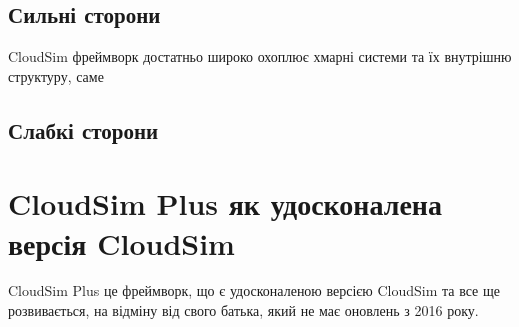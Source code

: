 \subsection{Сильні сторони}

CloudSim фреймворк \cite{CloudSim} достатньо широко охоплює хмарні системи та їх внутрішню структуру, саме 

\subsection{Слабкі сторони}


\section{CloudSim Plus як удосконалена версія CloudSim}

CloudSim Plus \cite{CloudSimPlus} це фреймворк, що є удосконаленою версією CloudSim та все ще розвивається, на відміну від свого батька, який не має оновлень з 2016 року.